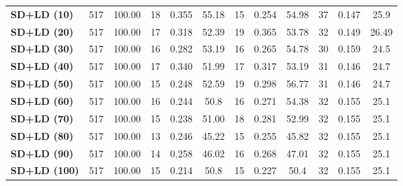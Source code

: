 \documentclass{ieeeaccess}
\begin{document}
\begin{table}[htbp]
\begin{tabular}{|l|c|c|ccc|ccc|ccc|}
\hline
\textbf{SD+LD (10)} & 517 & 100.00 & 18 & \cellcolor[HTML]{fef9e4}0.355 & \cellcolor[HTML]{fef9e4}55.18 & 15 & 0.254 & \cellcolor[HTML]{fef9e4}54.98 & 37 & 0.147 & 25.9 \\
\textbf{SD+LD (20)} & 517 & 100.00 & 17 & 0.318 & 52.39 & 19 & \cellcolor[HTML]{fef9e4}0.365 & 53.78 & 32 & 0.149 & \cellcolor[HTML]{fef9e4}26.49 \\
\textbf{SD+LD (30)} & 517 & 100.00 & 16 & 0.282 & 53.19 & 16 & 0.265 & 54.78 & 30 & \cellcolor[HTML]{FEF9E4}0.159 & 24.5 \\
\textbf{SD+LD (40)} & 517 & 100.00 & 17 & 0.340 & 51.99 & 17 & 0.317 & 53.19 & 31 & 0.146 & 24.7 \\
\textbf{SD+LD (50)} & 517 & 100.00 & 15 & 0.248 & 52.59 & 19 & 0.298 & 56.77 & 31 & 0.146 & 24.7 \\
\textbf{SD+LD (60)} & 517 & 100.00 & 16 & 0.244 & 50.8 & 16 & 0.271 & 54.38 & 32 & 0.155 & 25.1 \\
\textbf{SD+LD (70)} & 517 & 100.00 & 15 & 0.238 & 51.00 & 18 & 0.281 & 52.99 & 32 & 0.155 & 25.1 \\
\textbf{SD+LD (80)} & 517 & 100.00 & 13 & 0.246 & 45.22 & 15 & 0.255 & 45.82 & 32 & 0.155 & 25.1 \\
\textbf{SD+LD (90)} & 517 & 100.00 & 14 & 0.258 & 46.02 & 16 & 0.268 & 47.01 & 32 & 0.155 & 25.1 \\
\textbf{SD+LD (100)} & 517 & 100.00 & 15 & 0.214 & 50.8 & 15 & 0.227 & 50.4 & 32 & 0.155 & 25.1 \\
\hline
\end{tabular}
\end{table}
\end{document}
